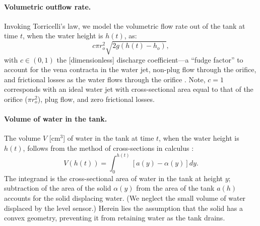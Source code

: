 \documentclass[openacc]{rsproca_new}%
\begin{document}
\paragraph{Volumetric outflow rate.}
Invoking Torricelli's law, we model the volumetric flow rate out of the tank at time $t$, when the water height is $h(t)$, as:
\begin{equation}
	c \pi r_o^2 \sqrt{2 g(h(t)-h_o)}, \label{eq:outletflow}
\end{equation}
with $c\in(0,1)$ the [dimensionless] discharge coefficient---a ``fudge factor'' to account for the vena contracta in the water jet, non-plug flow through the orifice, and frictional losses as the water flows through the orifice \cite{horsch2020simple,teoman2022discharge,hicks2014determining,blasone2015discharge,lienhard1984velocity,wadhwa2021study}. 
Note, $c=1$ corresponds with an ideal water jet with cross-sectional area equal to that of the orifice ($\pi r_o^2$), plug flow, and zero frictional losses.

\paragraph{Volume of water in the tank.} 
The volume $V$ [cm$^3$] of water in the tank at time $t$, when the water height is $h(t)$, follows from the method of cross-sections in calculus \cite{debook}:
\begin{equation}
	V(h(t))=\int_0^{h(t)} \left[a(y) - \alpha(y) \right] dy. \label{eq:volume}
\end{equation}
The integrand is the cross-sectional area of water in the tank at height $y$; subtraction of the area of the solid $\alpha(y)$ from the area of the tank $a(h)$ accounts for the solid displacing water. (We neglect the small volume of water displaced by the level sensor.) Herein lies the assumption that the solid has a convex geometry, preventing it from retaining water as the tank drains.
\end{document}
